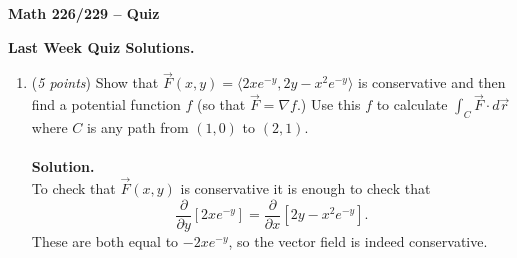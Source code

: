 \documentclass[12 pt]{article}
\begin{document}
	\begin{center}
		\textbf{\hfill Math 226/229 -- Quiz} \\
	\end{center}
	\medskip

	\noindent
	\textbf{Last Week Quiz Solutions.} \hfill
	\vspace{.1in}
	\hspace*{0.2in}
	\medskip
	\noindent
  \begin{enumerate}
		\item (\textit{5 points})
      Show that $\Vec{F}(x,y) = \langle 2x e^{-y},2y-x^2e^{-y} \rangle$ is
			conservative and then find a potential function $f$ (so that
			$\vec{F} = \nabla f$.) Use this $f$ to calculate
			$\int_C\vec{F}\cdot d\vec{r}$ where $C$ is any path from $(1,0)$ to
			$(2,1)$.
			\\~\\
    \textbf{Solution.}\\
		To check that $\vec{F}(x, y)$ is conservative it is enough to check that \[
			\frac{\partial}{\partial y} [2x e^{-y}] =
			\frac{\partial}{\partial x} [2y-x^2e^{-y}].
		\] These are both equal to $-2xe^{-y}$, so the vector field is indeed
		conservative.


\end{enumerate}
\end{document}
